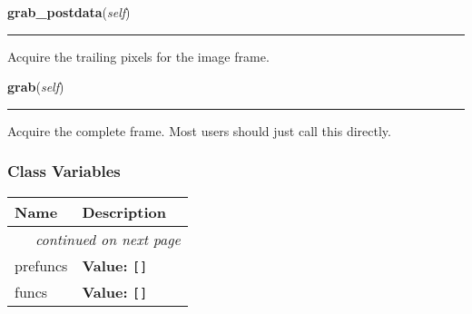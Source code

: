     \label{ociw:RawFrame:grab_postdata}

    \vspace{0.5ex}

    \begin{boxedminipage}{\textwidth}

    \raggedright \textbf{grab\_postdata}(\textit{self})

    \vspace{-1.5ex}

    \rule{\textwidth}{0.5\fboxrule}
    Acquire the trailing pixels for the image frame.

    \vspace{1ex}

    \end{boxedminipage}

    \label{ociw:RawFrame:grab}

    \vspace{0.5ex}

    \begin{boxedminipage}{\textwidth}

    \raggedright \textbf{grab}(\textit{self})

    \vspace{-1.5ex}

    \rule{\textwidth}{0.5\fboxrule}
    Acquire the complete frame. Most users should just call this directly.

    \vspace{1ex}

    \end{boxedminipage}



  \subsubsection{Class Variables}

\begin{longtable}{|p{}|p{}|l}
\cline{1-2}
\cline{1-2} \centering \textbf{Name} & \centering \textbf{Description}& \\
\cline{1-2}
\endhead\cline{1-2}\multicolumn{3}{r}{\small\textit{continued on next page}}\\\endfoot\cline{1-2}
\endlastfoot\raggedright p\-r\-e\-f\-u\-n\-c\-s\- & \textbf{Value:} 
{\tt [\-]\-}&\\
\cline{1-2}
\raggedright f\-u\-n\-c\-s\- & \textbf{Value:} 
{\tt [\-]\-}&\\
\cline{1-2}
\end{longtable}

